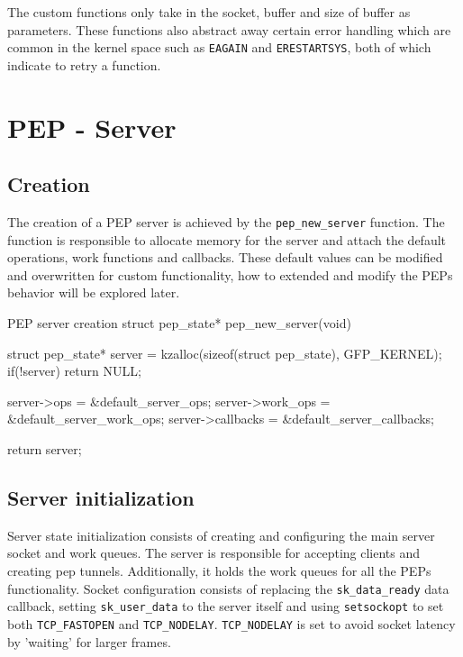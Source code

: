 \documentclass[a4paper,english, 11pt]{report}
\begin{document}
The custom functions only take in the socket, buffer and size of buffer as parameters. These functions also abstract away certain error handling which are common in the kernel space such as \verb|EAGAIN| and \verb|ERESTARTSYS|, both of which indicate to retry a function.

\section{PEP - Server}

\subsection{Creation}

The creation of a PEP server is achieved by the \verb|pep_new_server| function. The function is responsible to allocate memory for the server and attach the default operations, work functions and callbacks. These default values can be modified and overwritten for custom functionality, how to extended and modify the PEPs behavior will be explored later.

\begin{autonumlstlisting}[label=lst:pep_creation]{PEP server creation}
struct pep_state* pep_new_server(void)
{
    struct pep_state* server = kzalloc(sizeof(struct pep_state), GFP_KERNEL);
    if(!server){
        return NULL;
    }

    server->ops = &default_server_ops;
    server->work_ops = &default_server_work_ops;
    server->callbacks = &default_server_callbacks;

    return server;
}
\end{autonumlstlisting}

\subsection{Server initialization}
Server state initialization consists of creating and configuring the main server socket and work queues. The server is responsible for accepting clients and creating pep tunnels. Additionally, it holds the work queues for all the PEPs functionality. Socket configuration consists of replacing the \verb|sk_data_ready| data callback, setting \verb|sk_user_data| to the server itself and using \verb|setsockopt| to set both \verb|TCP_FASTOPEN| and \verb|TCP_NODELAY|. \verb|TCP_NODELAY| is set to avoid socket latency by 'waiting' for larger frames.
\end{document}
